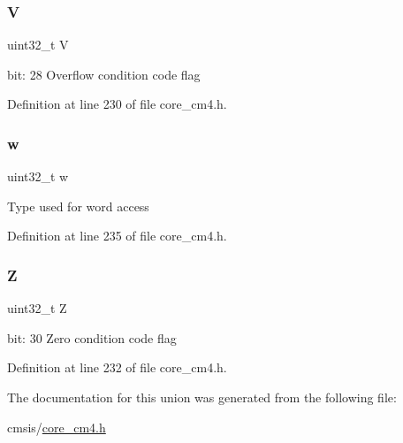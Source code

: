 \mbox{\label{union_a_p_s_r___type_acd4a2b64faee91e4a9eef300667fa222}} 
\subsubsection{\texorpdfstring{V}{V}}
{\footnotesize\ttfamily uint32\+\_\+t V}

bit\+: 28 Overflow condition code flag 

Definition at line 230 of file core\+\_\+cm4.\+h.

\mbox{\label{union_a_p_s_r___type_ad0fb62e7a08e70fc5e0a76b67809f84b}} 
\subsubsection{\texorpdfstring{w}{w}}
{\footnotesize\ttfamily uint32\+\_\+t w}

Type used for word access 

Definition at line 235 of file core\+\_\+cm4.\+h.

\mbox{\label{union_a_p_s_r___type_a5ae954cbd9986cd64625d7fa00943c8e}} 
\subsubsection{\texorpdfstring{Z}{Z}}
{\footnotesize\ttfamily uint32\+\_\+t Z}

bit\+: 30 Zero condition code flag 

Definition at line 232 of file core\+\_\+cm4.\+h.



The documentation for this union was generated from the following file\+:\begin{DoxyCompactItemize}
\item 
cmsis/\hyperlink{core__cm4_8h}{core\+\_\+cm4.\+h}\end{DoxyCompactItemize}
